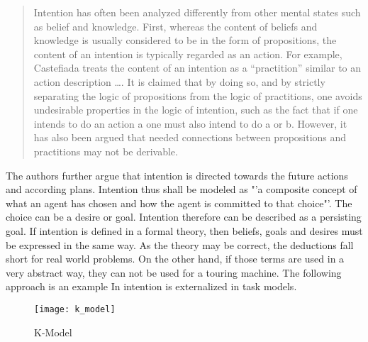 \begin{quotation}
  Intention has often been analyzed differently from other mental states such as belief and knowledge. First, whereas the content of beliefs and knowledge is usually considered to be in the form of propositions, the content of an intention is typically regarded as an action. For example, Castefiada treats the content of an intention as a "`practition"' similar to an action description \dots. It is claimed that by doing so, and by strictly separating the logic of propositions from the logic of practitions, one avoids undesirable properties in the logic of intention, such as the fact that if one intends to do an action a one must also intend to do a or b. However, it has also been argued that needed connections between propositions and practitions may not be derivable.
\end{quotation}

The authors further argue that intention is directed towards the future actions and according plans. Intention thus shall be modeled as "'a composite concept of what an agent has chosen and how the agent is committed to that choice"'. The choice can be a desire or goal. Intention therefore can be described as a persisting goal. If intention is defined in a formal theory, then beliefs, goals and desires must be expressed in the same way. As the theory may be correct, the deductions fall short for real world problems. On the other hand, if those terms are used in a very abstract way, they can not be used for a touring machine. The following approach is an example In \cite{schmidt2011task} intention is externalized in task models. 

\begin{figure}[ht]
	\centering
  \texttt{[image: k\_model]}
	\caption{K-Model}
	\label{fig1}
\end{figure}

